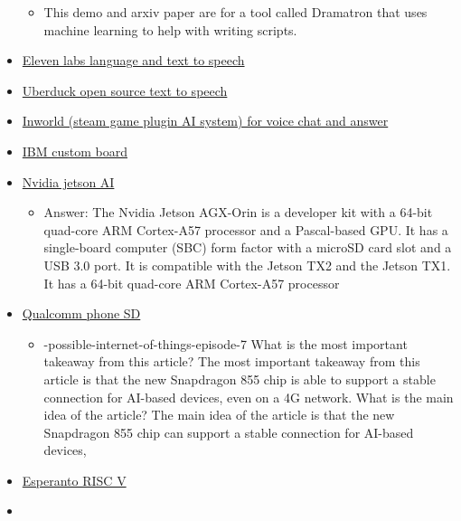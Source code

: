 \begin{itemize}
  \begin{itemize}
  \tightlist
  \item
    This demo and arxiv paper are for a tool called Dramatron that uses
    machine learning to help with writing scripts.
  \end{itemize}
\item
  \href{https://beta.elevenlabs.io/}{Eleven labs language and text to
  speech}
\item
  \href{https://uberduck.ai/}{Uberduck open source text to speech}
\item
  \href{https://www.youtube.com/watch?v=DnF4WzM5LPU}{Inworld (steam game
  plugin AI system) for voice chat and answer}
\item
  \href{https://www.marktechpost.com/2022/10/27/ibm-research-introduces-artificial-intelligence-unit-aiu-its-first-complete-system-on-chip-designed-to-run-and-train-deep-learning-models-faster-and-more-efficiently-than-a-general-purpose-cpu/}{IBM
  custom board}
\item
  \href{https://www.okdo.com/p/nvidia-jetson-agx-orin-64gb-developer-kit/}{Nvidia
  jetson AI}

  \begin{itemize}
  \tightlist
  \item
    Answer: The Nvidia Jetson AGX-Orin is a developer kit with a 64-bit
    quad-core ARM Cortex-A57 processor and a Pascal-based GPU. It has a
    single-board computer (SBC) form factor with a microSD card slot and
    a USB 3.0 port. It is compatible with the Jetson TX2 and the Jetson
    TX1. It has a 64-bit quad-core ARM Cortex-A57 processor
  \end{itemize}
\item
  \href{https://www.theverge.com/2023/2/23/23611668/ai-image-stable-diffusion-mobile-android-qualcomm-fastest}{Qualcomm
  phone SD}

  \begin{itemize}
  \tightlist
  \item
    -possible-internet-of-things-episode-7 What is the most important
    takeaway from this article? The most important takeaway from this
    article is that the new Snapdragon 855 chip is able to support a
    stable connection for AI-based devices, even on a 4G network. What
    is the main idea of the article? The main idea of the article is
    that the new Snapdragon 855 chip can support a stable connection for
    AI-based devices,
  \end{itemize}
\item
  \href{https://www.esperanto.ai/}{Esperanto RISC V}
\item
  \href{https://hdh4797.wixsite.com/dhan/project-1}{}


\end{itemize}
